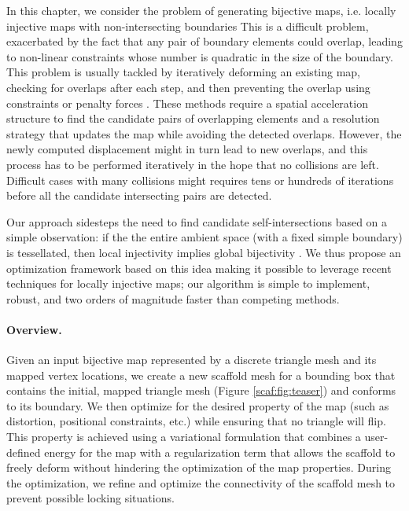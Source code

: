 In this chapter, we consider the problem of generating bijective maps, i.e. locally injective maps with {non-intersecting boundaries} %
This is a difficult problem, exacerbated by the fact that any pair of {boundary elements could overlap, leading to non-linear constraints whose number is quadratic in the size of the boundary}. %
This problem is usually tackled by iteratively deforming an existing map, checking for overlaps after each step, and then preventing the overlap using constraints \cite{Harmon:2011} or penalty forces \cite{harmon2010robust}. These methods require a spatial acceleration structure to find the candidate pairs of overlapping elements and a resolution strategy that updates the map while avoiding the detected overlaps. {However, t}he newly computed displacement might {in turn} lead to new overlaps, and this process {has to be} performed iteratively {in the hope that} no  collisions are {left}. Difficult cases with many collisions might requires tens or hundreds of iterations before all the candidate intersecting pairs are detected.

Our approach sidesteps the need to find candidate self-intersections {based on a} simple observation: if the the entire ambient space {(with a fixed simple boundary)} is tessellated, then local injectivity implies global bijectivity \cite{Zhang:2005,Lipman:2013ArXiv,Muller:2015}. We {thus} propose an optimization framework based on this idea {making it possible to} leverage recent techniques for {locally} injective maps; our algorithm is simple to implement, robust, and two orders of magnitude faster than competing methods.

\paragraph{Overview.} Given an input bijective map represented by a discrete triangle mesh and its mapped vertex locations, we create a new scaffold mesh for a bounding box that contains the initial, mapped triangle mesh (Figure \ref{scaf:fig:teaser}) and conforms to its boundary. We then optimize for the desired property of the map (such as distortion, positional constraints, etc.) while ensuring that no triangle will flip. This property is achieved using a variational formulation that combines a user-defined energy for the map with a regularization term that allows the scaffold to freely deform without hindering the optimization of the map properties. During the optimization, we refine and optimize the connectivity of the scaffold mesh to prevent possible locking situations.

